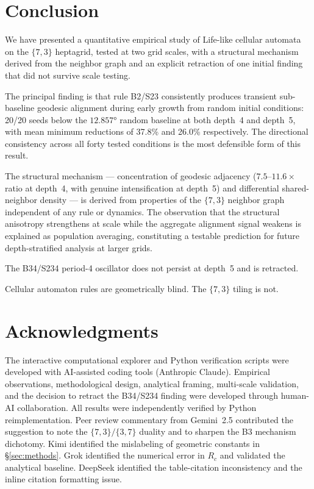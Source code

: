 \documentclass[12pt,a4paper]{article}
\begin{document}
\section{Conclusion}

We have presented a quantitative empirical study of Life-like cellular automata on the $\{7,3\}$ heptagrid, tested at two grid scales, with a structural mechanism derived from the neighbor graph and an explicit retraction of one initial finding that did not survive scale testing.

The principal finding is that rule B2/S23 consistently produces transient sub-baseline geodesic alignment during early growth from random initial conditions: 20/20 seeds below the $12.857°$ random baseline at both depth~4 and depth~5, with mean minimum reductions of 37.8\% and 26.0\% respectively. The directional consistency across all forty tested conditions is the most defensible form of this result.

The structural mechanism --- concentration of geodesic adjacency ($7.5$--$11.6\times$ ratio at depth~4, with genuine intensification at depth~5) and differential shared-neighbor density --- is derived from properties of the $\{7,3\}$ neighbor graph independent of any rule or dynamics. The observation that the structural anisotropy strengthens at scale while the aggregate alignment signal weakens is explained as population averaging, constituting a testable prediction for future depth-stratified analysis at larger grids.

The B34/S234 period-4 oscillator does not persist at depth~5 and is retracted.

\medskip
\noindent Cellular automaton rules are geometrically blind. The $\{7,3\}$ tiling is not.

\section*{Acknowledgments}

The interactive computational explorer and Python verification scripts were developed with AI-assisted coding tools (Anthropic Claude). Empirical observations, methodological design, analytical framing, multi-scale validation, and the decision to retract the B34/S234 finding were developed through human-AI collaboration. All results were independently verified by Python reimplementation. Peer review commentary from Gemini~2.5 contributed the suggestion to note the $\{7,3\}/\{3,7\}$ duality and to sharpen the B3 mechanism dichotomy. Kimi identified the mislabeling of geometric constants in \S\ref{sec:methods}. Grok identified the numerical error in $R_c$ and validated the analytical baseline. DeepSeek identified the table-citation inconsistency and the inline citation formatting issue.
\end{document}

